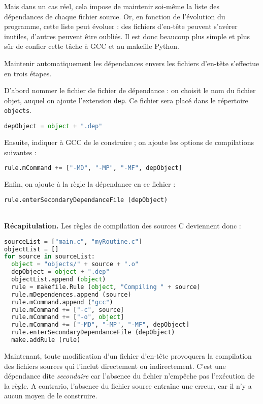 \documentclass[a4paper,12pt,obeyspaces,openany]{extarticle}
\begin{document}
Mais dans un cas réel, cela impose de maintenir soi-même la liste des dépendances de chaque fichier source. Or, en fonction de l'évolution du programme, cette liste peut évoluer : des fichiers d'en-tête peuvent s'avérer inutiles, d'autres peuvent être oubliés. Il est donc beaucoup plus simple et plus sûr de confier cette tâche à GCC et au makefile Python.

Maintenir automatiquement les dépendances envers les fichiers d'en-tête s'effectue en trois étapes.

D'abord nommer le fichier de fichier de dépendance : on choisit le nom du fichier objet, auquel on ajoute l'extension \texttt{dep}. Ce fichier sera placé dans le répertoire \texttt{objects}.
\begin{lstlisting}[language=py]
  depObject = object + ".dep"
\end{lstlisting}

Ensuite, indiquer à GCC de le construire ; on ajoute les options de compilations suivantes :
\begin{lstlisting}[language=py]
  rule.mCommand += ["-MD", "-MP", "-MF", depObject]
\end{lstlisting}

Enfin, on ajoute à la règle la dépendance en ce fichier :
\begin{lstlisting}[language=py]
  rule.enterSecondaryDependanceFile (depObject)
\end{lstlisting}


~\\{\bf Récapitulation.} Les règles de compilation des sources C deviennent donc :
\begin{lstlisting}[language=py]
sourceList = ["main.c", "myRoutine.c"]
objectList = []
for source in sourceList:
  object = "objects/" + source + ".o"
  depObject = object + ".dep"
  objectList.append (object)
  rule = makefile.Rule (object, "Compiling " + source)
  rule.mDependences.append (source)
  rule.mCommand.append ("gcc")
  rule.mCommand += ["-c", source]
  rule.mCommand += ["-o", object]
  rule.mCommand += ["-MD", "-MP", "-MF", depObject]
  rule.enterSecondaryDependanceFile (depObject)
  make.addRule (rule)
\end{lstlisting}

Maintenant, toute modification d'un fichier d'en-tête provoquera la compilation des fichiers sources qui l'inclut directement ou indirectement. C'est une dépendance dite \emph{secondaire} car l'absence du fichier n'empêche pas l'exécution de la règle. A contrario, l'absence du fichier source entraîne une erreur, car il n'y a aucun moyen de le construire.
\end{document}
